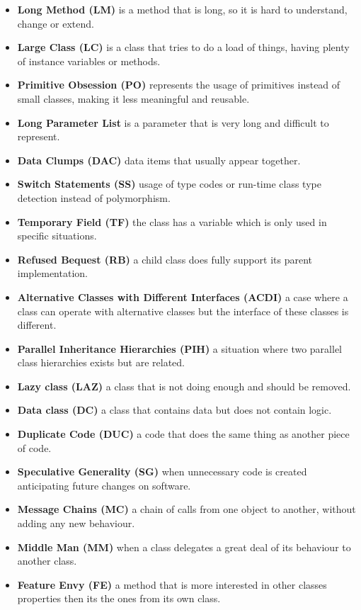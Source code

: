 \begin{itemize}
	\item \textbf{Long Method (LM)} is a method that is long, so it is hard to understand, change or extend.
	\item \textbf{Large Class (LC)} is a class that tries to do a load of things, having plenty of instance variables or methods.
	\item \textbf{Primitive Obsession (PO)} represents the usage of primitives instead of small classes, making it less meaningful and reusable.
	\item \textbf{Long Parameter List} is a parameter that is very long and difficult to represent.
	\item \textbf{Data Clumps (DAC)} data items that usually appear together.
	\item \textbf{Switch Statements (SS)} usage of type codes or run-time class type detection instead of polymorphism.
	\item \textbf{Temporary Field (TF)} the class has a variable which is only used in specific situations.
	\item \textbf{Refused Bequest (RB)} a child class does fully support its parent implementation.
	\item \textbf{Alternative Classes with Different Interfaces (ACDI)} a case where a class can operate with alternative classes but the interface of these classes is different.
	\item \textbf{Parallel Inheritance Hierarchies (PIH)} a situation where two parallel class hierarchies exists but are related.
	\item \textbf{Lazy class (LAZ)} a class that is not doing enough and should be removed.
	\item \textbf{Data class (DC)} a class that contains data but does not contain logic.
	\item \textbf{Duplicate Code (DUC)} a code that does the same thing as another piece of code.
	\item \textbf{Speculative Generality (SG)} when unnecessary code is created anticipating future changes on software.
	\item \textbf{Message Chains (MC)} a chain of calls from one object to another, without adding any new behaviour.
	\item \textbf{Middle Man (MM)} when a class delegates a great deal of its behaviour to another class.
	\item \textbf{Feature Envy (FE)} a method that is more interested in other classes properties then its the ones from its own class.

\end{itemize}
